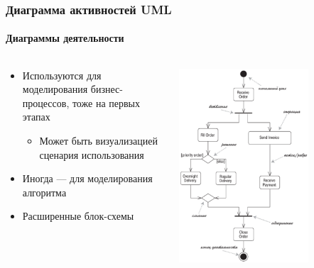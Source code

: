 \documentclass{../../slides-style}
\begin{document}
    \begin{frame}
        \frametitle{Диаграмма активностей UML}
        \framesubtitle{Диаграммы деятельности}
        \begin{columns}
            \begin{column}{0.5\textwidth}
                \begin{itemize}
                    \item Используются для моделирования бизнес-процессов, тоже на первых этапах
                    \begin{itemize}
                        \item Может быть визуализацией сценария использования
                    \end{itemize}
                    \item Иногда --- для моделирования алгоритма
                    \item Расширенные блок-схемы
                \end{itemize}
            \end{column}
            \begin{column}{0.5\textwidth}
                \begin{center}
                    \includegraphics[width=0.7\textwidth]{activityDiagram.png}
                \end{center}
            \end{column}
        \end{columns}
    \end{frame}
\end{document}

